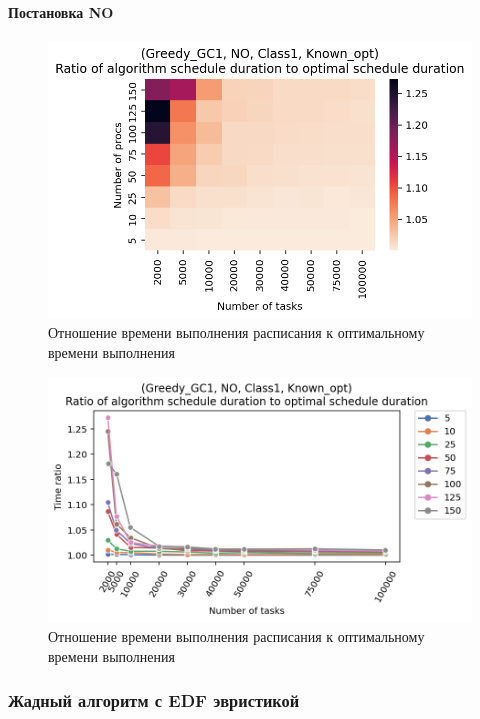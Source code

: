 \paragraph{Постановка NO}

\begin{figure}[!htbp]
    \centering
    \includegraphics[width=\textwidth]{imgs/ideal_1/NO/th.png}
    \caption{Отношение времени выполнения расписания к оптимальному времени выполнения}   
    \label{fig:NO-GC1-times-heatmap}
\end{figure}

\begin{figure}[!htbp]
    \centering
    \includegraphics[width=\textwidth]{imgs/ideal_1/NO/gr_amalgamated.png}
    \caption{Отношение времени выполнения расписания к оптимальному времени выполнения}   
    \label{fig:NO-GC1-times-compiled}
\end{figure}

\subsubsection{Жадный алгоритм с EDF эвристикой}

